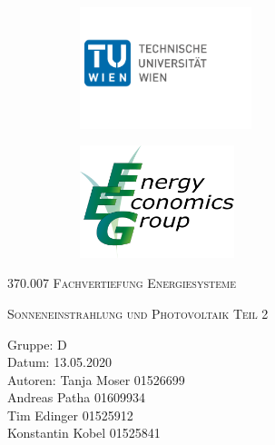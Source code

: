 \documentclass[a4paper,12pt]{article}
\begin{document}
	\begin{titlepage}
		\begin{figure}[h]
			\begin{subfigure}{1cm}
				\includegraphics[width=5cm]{img/TU_Logo}
			\end{subfigure}
			\hspace{10cm}
			\begin{subfigure}{6cm}
				\includegraphics[width=4.5cm]{img/EEG_logo}
			\end{subfigure}
		\end{figure}
		\centering
		\bigskip \bigskip \bigskip \bigskip \bigskip
		\scshape\LARGE 370.007 Fachvertiefung Energiesysteme\par
		\vspace{1cm}
		\scshape\large Sonneneinstrahlung und Photovoltaik Teil 2 \par
		\vspace{8cm}
		\raggedright
		\large Gruppe: D \\
		Datum: 13.05.2020 \\
		Autoren: Tanja Moser 01526699\\
		\hspace{2.4cm} Andreas Patha 01609934\\
		\hspace{2.4cm} Tim Edinger 01525912\\
		\hspace{2.4cm} Konstantin Kobel 01525841\\
		\vfill
		\large \par
	\end{titlepage}
\end{document}
